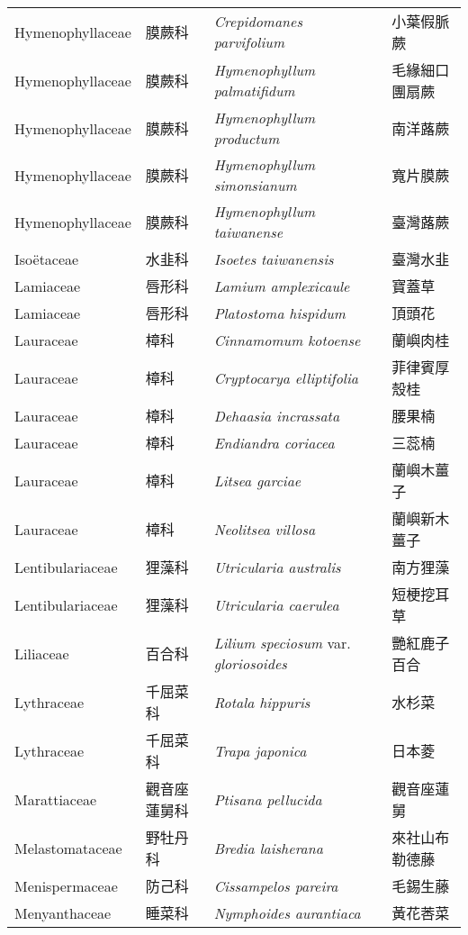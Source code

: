 \begin{longtable}{p{3cm}p{2cm}p{5cm}p{3cm}}
    Hymenophyllaceae & 膜蕨科 & \textit{Crepidomanes parvifolium}  & 小葉假脈蕨\\
    Hymenophyllaceae & 膜蕨科 & \textit{Hymenophyllum palmatifidum}  & 毛緣細口團扇蕨\\
    Hymenophyllaceae & 膜蕨科 & \textit{Hymenophyllum productum}  & 南洋蕗蕨\\
    Hymenophyllaceae & 膜蕨科 & \textit{Hymenophyllum simonsianum}  & 寬片膜蕨\\
    Hymenophyllaceae & 膜蕨科 & \textit{Hymenophyllum taiwanense}  & 臺灣蕗蕨\\
    Isoëtaceae & 水韭科 & \textit{Isoetes taiwanensis}  & 臺灣水韭\\
    Lamiaceae & 唇形科 & \textit{Lamium amplexicaule}  & 寶蓋草\\
    Lamiaceae & 唇形科 & \textit{Platostoma hispidum}  & 頂頭花\\
    Lauraceae & 樟科 & \textit{Cinnamomum kotoense}  & 蘭嶼肉桂\\
    Lauraceae & 樟科 & \textit{Cryptocarya elliptifolia}  & 菲律賓厚殼桂\\
    Lauraceae & 樟科 & \textit{Dehaasia incrassata}  & 腰果楠\\
    Lauraceae & 樟科 & \textit{Endiandra coriacea}  & 三蕊楠\\
    Lauraceae & 樟科 & \textit{Litsea garciae}  & 蘭嶼木薑子\\
    Lauraceae & 樟科 & \textit{Neolitsea villosa}  & 蘭嶼新木薑子\\
    Lentibulariaceae & 狸藻科 & \textit{Utricularia australis}  & 南方狸藻\\
    Lentibulariaceae & 狸藻科 & \textit{Utricularia caerulea}  & 短梗挖耳草\\
    Liliaceae & 百合科 & \textit{Lilium speciosum} var. \textit{gloriosoides}  & 艷紅鹿子百合\\
    Lythraceae & 千屈菜科 & \textit{Rotala hippuris}  & 水杉菜\\
    Lythraceae & 千屈菜科 & \textit{Trapa japonica}  & 日本菱\\
    Marattiaceae & 觀音座蓮舅科 & \textit{Ptisana pellucida}  & 觀音座蓮舅\\
    Melastomataceae & 野牡丹科 & \textit{Bredia laisherana}  & 來社山布勒德藤\\
    Menispermaceae & 防己科 & \textit{Cissampelos pareira}  & 毛錫生藤\\
    Menyanthaceae & 睡菜科 & \textit{Nymphoides aurantiaca}  & 黃花莕菜\\

\end{longtable}
